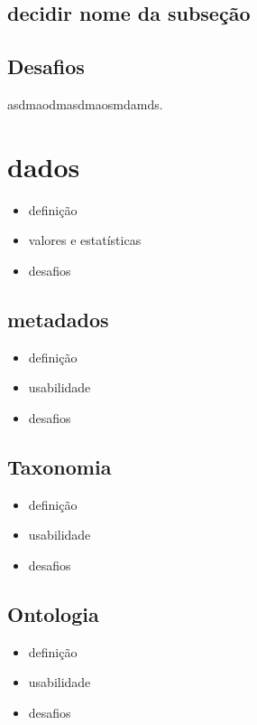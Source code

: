 \subsection{decidir nome da subseção}



\subsection{Desafios}
	asdmaodmasdmaosmdamds.


\section{dados}%
	\begin{itemize}
		\item definição
		\item valores e estatísticas
		\item desafios
	\end{itemize}
	\subsection{metadados}
		\begin{itemize}
			\item definição
			\item usabilidade
			\item desafios
		\end{itemize}
	\subsection{Taxonomia}
		\begin{itemize}
			\item definição
			\item usabilidade
			\item desafios
		\end{itemize}
	\subsection{Ontologia}
		\begin{itemize}
			\item definição
		 	\item usabilidade
			\item desafios
		\end{itemize}
